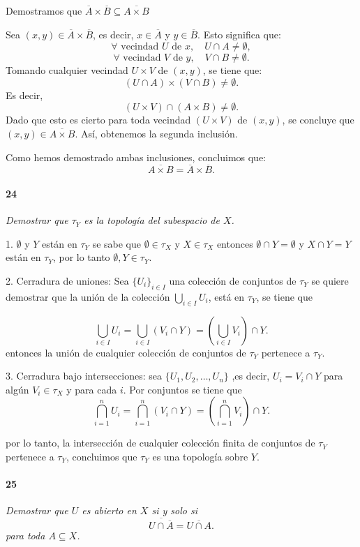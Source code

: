 \documentclass[12pt]{article}
\begin{document}
Demostramos que $\overline{A} \times \overline{B} \subseteq \overline{A \times B}$

Sea $(x, y) \in \overline{A} \times \overline{B}$, es decir, $x \in \overline{A}$ y $y \in \overline{B}$. Esto significa que:
\[
\forall \text{ vecindad } U \text{ de } x, \quad U \cap A \neq \emptyset,
\]
\[
\forall \text{ vecindad } V \text{ de } y, \quad V \cap B \neq \emptyset.
\]
Tomando cualquier vecindad $U \times V$ de $(x, y)$, se tiene que:
\[
(U \cap A) \times (V \cap B) \neq \emptyset.
\]
Es decir,
\[
(U \times V) \cap (A \times B) \neq \emptyset.
\]
Dado que esto es cierto para toda vecindad $(U \times V)$ de $(x, y)$, se concluye que $(x, y) \in \overline{A \times B}$. Así, obtenemos la segunda inclusión.

Como hemos demostrado ambas inclusiones, concluimos que:
\[
\overline{A \times B} = \overline{A} \times \overline{B}.
\]

\paragraph{24}
\textit{Demostrar que \(\tau_Y\) es la topología del subespacio de \( X \).}

1. \( \emptyset \) y \( Y \) est\'an en \( \tau_Y \) se sabe que \( \emptyset \in \tau_X \) y \( X \in \tau_X \)
entonces \( \emptyset \cap Y = \emptyset \) y \( X \cap Y = Y \) están en \( \tau_Y \), por lo tanto \( \emptyset, Y \in \tau_Y \).

2. Cerradura de uniones: Sea \( \{ U_i \}_{i \in I} \) una colecci\'on de conjuntos de \( \tau_Y \)
se quiere demostrar que la unión de la colecci\'on \( \bigcup_{i \in I} U_i \), está en \( \tau_Y \), se tiene que

\[
\bigcup_{i \in I} U_i = \bigcup_{i \in I} (V_i \cap Y) = \left( \bigcup_{i \in I} V_i \right) \cap Y.
\]
entonces la unión de cualquier colecci\'on de conjuntos de \( \tau_Y \) pertenece a \( \tau_Y \).

3. Cerradura bajo intersecciones: sea \( \{ U_1, U_2, \dots, U_n \} \) ,es decir, \( U_i = V_i \cap Y \) para algún \( V_i \in \tau_X \) y para cada \( i \). 
Por conjuntos se tiene que
\[
\bigcap_{i=1}^n U_i = \bigcap_{i=1}^n (V_i \cap Y) = \left( \bigcap_{i=1}^n V_i \right) \cap Y.
\]

por lo tanto, la intersección de cualquier colecci\'on finita de conjuntos de \( \tau_Y \) pertenece a \( \tau_Y \), 
concluimos que \( \tau_Y \) es una topolog\'ia sobre \( Y \).

\paragraph{25}
\textit{Demostrar que \( U \) es abierto en \( X \) si y solo si\[
\overline{U \cap \overline{A}} = \overline{U \cap A}.
\] para toda \( A \subseteq X \).}
\end{document}
